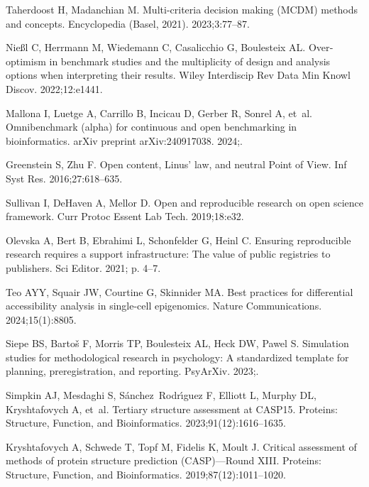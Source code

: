 \documentclass[11pt]{article}
\begin{document}
\begin{thebibliography}{10}
Taherdoost H, Madanchian M.
\newblock Multi-criteria decision making ({MCDM}) methods and concepts.
\newblock Encyclopedia (Basel, 2021). 2023;3:77--87.

Nießl C, Herrmann M, Wiedemann C, Casalicchio G, Boulesteix AL.
\newblock Over‐optimism in benchmark studies and the multiplicity of design
  and analysis options when interpreting their results.
\newblock Wiley Interdiscip Rev Data Min Knowl Discov. 2022;12:e1441.

Mallona I, Luetge A, Carrillo B, Incicau D, Gerber R, Sonrel A, et~al.
\newblock Omnibenchmark (alpha) for continuous and open benchmarking in
  bioinformatics.
\newblock arXiv preprint arXiv:240917038. 2024;.

Greenstein S, Zhu F.
\newblock Open content, Linus’ law, and neutral Point of View.
\newblock Inf Syst Res. 2016;27:618--635.

Sullivan I, DeHaven A, Mellor D.
\newblock Open and reproducible research on open science framework.
\newblock Curr Protoc Essent Lab Tech. 2019;18:e32.

Olevska A, Bert B, Ebrahimi L, Schonfelder G, Heinl C.
\newblock Ensuring reproducible research requires a support infrastructure: The
  value of public registries to publishers.
\newblock Sci Editor. 2021; p. 4--7.

Teo AYY, Squair JW, Courtine G, Skinnider MA.
\newblock Best practices for differential accessibility analysis in single-cell
  epigenomics.
\newblock Nature Communications. 2024;15(1):8805.

Siepe BS, Bartoš F, Morris TP, Boulesteix AL, Heck DW, Pawel S.
\newblock Simulation studies for methodological research in psychology: A
  standardized template for planning, preregistration, and reporting.
\newblock PsyArXiv. 2023;.

Simpkin AJ, Mesdaghi S, S{\'a}nchez~Rodr{\'\i}guez F, Elliott L, Murphy DL,
  Kryshtafovych A, et~al.
\newblock Tertiary structure assessment at CASP15.
\newblock Proteins: Structure, Function, and Bioinformatics.
  2023;91(12):1616--1635.

Kryshtafovych A, Schwede T, Topf M, Fidelis K, Moult J.
\newblock Critical assessment of methods of protein structure prediction
  (CASP)—Round XIII.
\newblock Proteins: Structure, Function, and Bioinformatics.
  2019;87(12):1011--1020.


\end{thebibliography}
\end{document}

